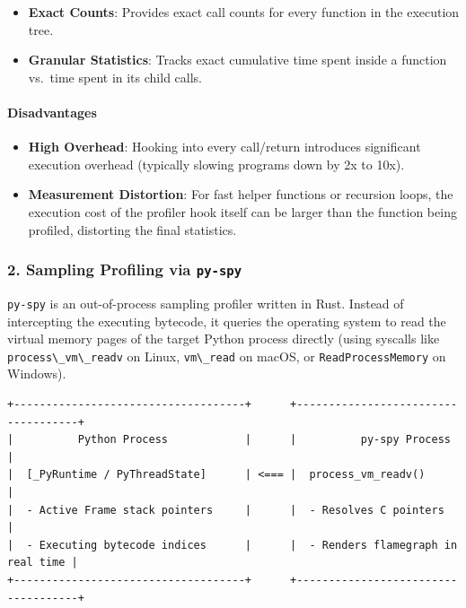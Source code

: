\begin{itemize}
\tightlist
\item
  \textbf{Exact Counts}: Provides exact call counts for every function
  in the execution tree.
\item
  \textbf{Granular Statistics}: Tracks exact cumulative time spent
  inside a function vs.~time spent in its child calls.
\end{itemize}

\hypertarget{disadvantages}{%
\paragraph{Disadvantages}\label{disadvantages}}

\begin{itemize}
\tightlist
\item
  \textbf{High Overhead}: Hooking into every call/return introduces
  significant execution overhead (typically slowing programs down by 2x
  to 10x).
\item
  \textbf{Measurement Distortion}: For fast helper functions or
  recursion loops, the execution cost of the profiler hook itself can be
  larger than the function being profiled, distorting the final
  statistics.
\end{itemize}

\hypertarget{sampling-profiling-via-py-spy}{%
\subsubsection{\texorpdfstring{2. Sampling Profiling via
\texttt{py-spy}}{2. Sampling Profiling via py-spy}}\label{sampling-profiling-via-py-spy}}

\passthrough{\lstinline!py-spy!} is an out-of-process sampling profiler
written in Rust. Instead of intercepting the executing bytecode, it
queries the operating system to read the virtual memory pages of the
target Python process directly (using syscalls like
\passthrough{\lstinline!process\_vm\_readv!} on Linux,
\passthrough{\lstinline!vm\_read!} on macOS, or
\passthrough{\lstinline!ReadProcessMemory!} on Windows).

\begin{lstlisting}
+------------------------------------+      +------------------------------------+
|          Python Process            |      |          py-spy Process            |
|  [_PyRuntime / PyThreadState]      | <=== |  process_vm_readv()                |
|  - Active Frame stack pointers     |      |  - Resolves C pointers             |
|  - Executing bytecode indices      |      |  - Renders flamegraph in real time |
+------------------------------------+      +------------------------------------+
\end{lstlisting}

